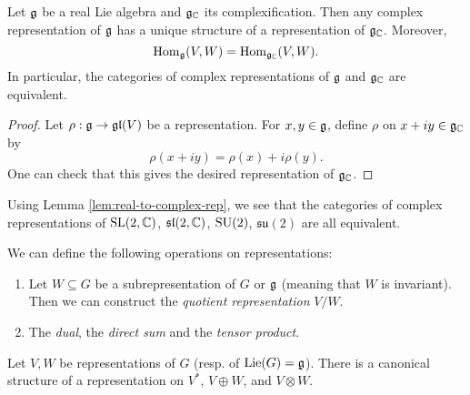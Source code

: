\begin{lemma}\label{lem:real-to-complex-rep}
  Let $\mathfrak{g}$ be a real Lie algebra and
  $\mathfrak{g}_{\mathbb{C}}$ its complexification. Then any
  complex representation of $\mathfrak{g}$ has a
  unique structure of a representation
  of $\mathfrak{g}_{\mathbb{C}}$. Moreover,
  \[
    \operatorname{Hom}_{\mathfrak{g}}(V, W)
    = \operatorname{Hom}_{\mathfrak{g}_{\mathbb{C}}}(V, W).
  \]
  In particular, the categories of
  complex representations of $\mathfrak{g}$ and
  $\mathfrak{g}_{\mathbb{C}}$ are equivalent.
\end{lemma}

\begin{proof}
  Let $\rho : \mathfrak{g} \to \mathfrak{gl}(V)$ be a
  representation. For $x, y \in \mathfrak{g}$, define
  $\rho$ on $x + iy \in \mathfrak{g}_{\mathbb{C}}$ by
  \[
    \rho(x + iy) = \rho(x) + i\rho(y).
  \]
  One can check that this gives the
  desired representation of
  $\mathfrak{g}_{\mathbb{C}}$.
\end{proof}

\begin{example}
  Using
  Lemma \ref{lem:real-to-complex-rep},
  we see that the categories of
  complex representations of
  $\operatorname{SL}(2, \mathbb{C})$, $\mathfrak{sl}(2, \mathbb{C})$, $\operatorname{SU}(2)$, $\mathfrak{su}(2)$
  are all equivalent.
\end{example}

\begin{remark}
  We can define the following
  operations on representations:
  \begin{enumerate}
    \item Let $W \subseteq G$ be a
      subrepresentation of $G$ or $\mathfrak{g}$
      (meaning that $W$ is invariant).
      Then we can construct the
      \emph{quotient representation}
      $V / W$.
    \item The \emph{dual}, the
      \emph{direct sum}
      and the \emph{tensor product}.
  \end{enumerate}
\end{remark}

\begin{lemma}
  Let $V, W$ be representations of $G$
  (resp. of $\operatorname{Lie}(G) = \mathfrak{g}$). There is a
  canonical structure of a representation
  on $V^*$, $V \oplus W$, and
  $V \otimes W$.
\end{lemma}

